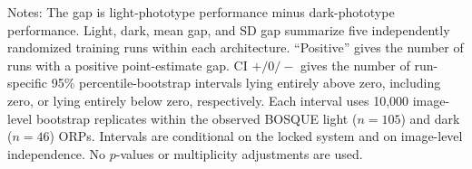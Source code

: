 \begin{table}[h!]
\begin{tabular}{llrrrrrr}
\bottomrule
\end{tabular}
\begin{flushleft}
\footnotesize Notes: The gap is light-phototype performance minus dark-phototype performance. Light, dark, mean gap, and SD gap summarize five independently randomized training runs within each architecture. ``Positive'' gives the number of runs with a positive point-estimate gap. CI $+/0/-$ gives the number of run-specific 95\% percentile-bootstrap intervals lying entirely above zero, including zero, or lying entirely below zero, respectively. Each interval uses 10{,}000 image-level bootstrap replicates within the observed BOSQUE light ($n=105$) and dark ($n=46$) ORPs. Intervals are conditional on the locked system and on image-level independence. No $p$-values or multiplicity adjustments are used.
\end{flushleft}
\end{table}
